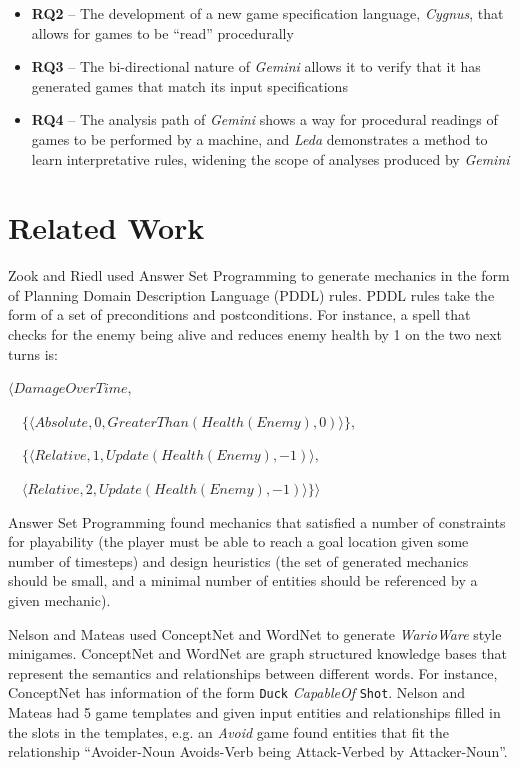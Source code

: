 \documentclass[12pt]{report}
\begin{document}
\begin{itemize}
\item \textbf{RQ2} -- The development of a new game specification language, \textit{Cygnus}, that allows for games to be ``read'' procedurally
\item \textbf{RQ3} -- The bi-directional nature of \textit{Gemini} allows it to verify that it has generated games that match its input specifications
\item \textbf{RQ4} -- The analysis path of \textit{Gemini} shows a way for procedural readings of games to be performed by a machine, and \textit{Leda} demonstrates a method to learn interpretative rules, widening the scope of analyses produced by \textit{Gemini}
\end{itemize}


\section*{Related Work}

Zook and Riedl \cite{AGDViaMechanics} used Answer Set Programming to generate mechanics in the form of Planning Domain Description Language (PDDL) rules.  PDDL rules take the form of a set of preconditions and postconditions.  For instance, a spell that checks for the enemy being
alive and reduces enemy health by 1 on the two next turns is:

$\langle DamageOverTime, $

$\quad \{\langle Absolute, 0, GreaterThan(Health(Enemy), 0)\rangle\}, $

$\quad \{\langle Relative, 1, Update(Health(Enemy), -1)\rangle, $

$ \quad  \langle Relative, 2,  Update(Health(Enemy),  -1)\rangle\}\rangle$

Answer Set Programming found mechanics that satisfied a number of constraints for playability (the player must be able to reach a goal location given some number of timesteps) and design heuristics (the set of generated mechanics should be small, and a minimal number of entities should be referenced by a given mechanic).  

Nelson and Mateas \cite{towardsAGD} used ConceptNet \cite{conceptnet} and WordNet \cite{wordnet} to generate \textit{WarioWare} style minigames.  ConceptNet and WordNet are graph structured knowledge bases that represent the semantics and relationships between different words.  For instance, ConceptNet has information of the form \texttt{Duck} \textit{CapableOf} \texttt{Shot}.  Nelson and Mateas had 5 game templates and given input entities and relationships filled in the slots in the templates, e.g. an \textit{Avoid} game found entities that fit the relationship ``Avoider-Noun Avoids-Verb being Attack-Verbed by Attacker-Noun''.  
\end{document}
